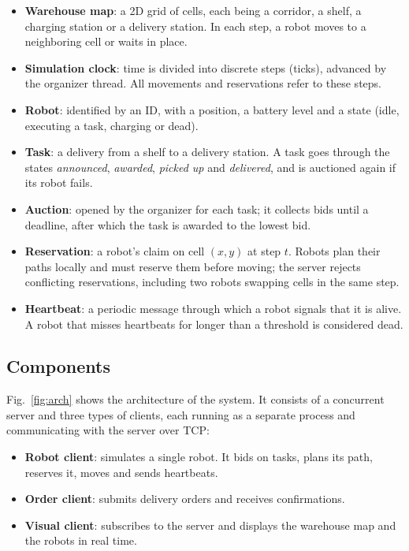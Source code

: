 \documentclass[runningheads]{llncs}
\begin{document}
\begin{itemize}
  \item \textbf{Warehouse map}: a 2D grid of cells, each being a corridor, a
        shelf, a charging station or a delivery station. In each step, a robot
        moves to a neighboring cell or waits in place.
  \item \textbf{Simulation clock}: time is divided into discrete steps
        (ticks), advanced by the organizer thread. All movements and
        reservations refer to these steps.
  \item \textbf{Robot}: identified by an ID, with a position, a battery level
        and a state (idle, executing a task, charging or dead).
  \item \textbf{Task}: a delivery from a shelf to a delivery station. A task
        goes through the states \emph{announced}, \emph{awarded},
        \emph{picked up} and \emph{delivered}, and is auctioned again if its
        robot fails.
  \item \textbf{Auction}: opened by the organizer for each task; it collects
        bids until a deadline, after which the task is awarded to the lowest
        bid.
  \item \textbf{Reservation}: a robot's claim on cell $(x, y)$ at step $t$.
        Robots plan their paths locally and must reserve them before moving;
        the server rejects conflicting reservations, including two robots
        swapping cells in the same step.
  \item \textbf{Heartbeat}: a periodic message through which a robot signals
        that it is alive. A robot that misses heartbeats for longer than a
        threshold is considered dead.
\end{itemize}

\subsection{Components}

Fig.~\ref{fig:arch} shows the architecture of the system. It consists of a
concurrent server and three types of clients, each running as a separate
process and communicating with the server over TCP:

\begin{itemize}
  \item \textbf{Robot client}: simulates a single robot. It bids on tasks,
        plans its path, reserves it, moves and sends heartbeats.
  \item \textbf{Order client}: submits delivery orders and receives
        confirmations.
  \item \textbf{Visual client}: subscribes to the server and displays the
        warehouse map and the robots in real time.
\end{itemize}
\end{document}
